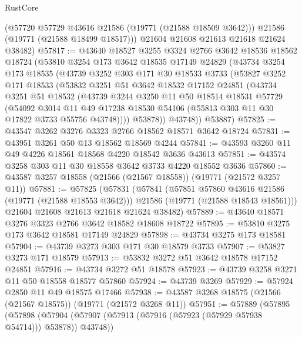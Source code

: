 \begin{lexlean}{RustCore}
\begin{coremodule}
        (@57720 @57729 @43616 @21586 (@19771 (@21588 @18509 @3642)))
        @21586
        (@19771 (@21588 @18499 @18517)))
      @21604
      @21608
      @21613
      @21618
      @21624
      @38482)
@57817 := @43640
    @18527
    @3255
    @3324
    @2766
    @3642
    @18536
    @18562
    @18724
    (@53810
      @3254
      @173
      @3642
      @18535
      @17149
      @24829
      (@43734
        @3254
        @173
        @18535
        (@43739
          @3252
          @303
          @171
          @30
          @18533
          @3733
          (@53827
            @3252
            @171
            @18533
            (@53832
              @3251
              @51
              @3642
              @18532
              @17152
              @24851
              (@43734
                @3251
                @51
                @18532
                (@43739
                  @3244
                  @3250
                  @11
                  @50
                  @18514
                  @18531
                  @57729
                  (@54092
                    @3014
                    @11
                    @49
                    @17238
                    @18530
                    @54106
                    (@55813 @303 @11 @30 @17822 @3733 @55756 @43748))))
              @53878))
          @43748))
      @53887)
@57825 := @43547 @3262 @3276 @3323 @2766 @18562 @18571 @3642 @18724
@57831 := @43951 @3261 @50 @13 @18562 @18569 @4244
@57841 := @43593 @3260 @11 @49 @4226 @18561 @18568 @4220 @18542 @3636 @43613
@57851 := @43574 @3258 @303 @11 @30 @18558 @3642 @3733 @4220 @18552 @3636
@57860 := @43587 @3257 @18558 (@21566 (@21567 @18558)) (@19771 (@21572 @3257 @11))
@57881 := @57825
    (@57831
      (@57841
        (@57851 @57860 @43616 @21586 (@19771 (@21588 @18553 @3642)))
        @21586
        (@19771 (@21588 @18543 @18561)))
      @21604
      @21608
      @21613
      @21618
      @21624
      @38482)
@57889 := @43640 @18571 @3276 @3323 @2766 @3642 @18582 @18608 @18722
@57895 := @53810 @3275 @173 @3642 @18581 @17149 @24829
@57898 := @43734 @3275 @173 @18581
@57904 := @43739 @3273 @303 @171 @30 @18579 @3733
@57907 := @53827 @3273 @171 @18579
@57913 := @53832 @3272 @51 @3642 @18578 @17152 @24851
@57916 := @43734 @3272 @51 @18578
@57923 := @43739 @3258 @3271 @11 @50 @18558 @18577 @57860
@57924 := @43739 @3269
@57929 := @57924 @2850 @11 @49 @18575 @17466
@57938 := @43587 @3268 @18575 (@21566 (@21567 @18575)) (@19771 (@21572 @3268 @11))
@57951 := @57889
    (@57895
      (@57898 (@57904 (@57907 (@57913 (@57916 (@57923 (@57929 @57938 @54714))) @53878)) @43748))

\end{coremodule}
\end{lexlean}
